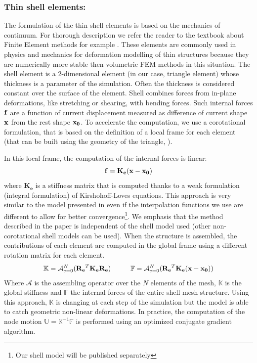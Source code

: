 \subsubsection{Thin shell elements: } 
The formulation of the thin shell elements is based on the mechanics of continuum. 
For thorough description we refer the reader to the textbook about Finite Element methods for example \cite{Reddy1993}.
These elements are commonly used in physics and mechanics for deformation modelling of thin structures because they are numerically more stable then volumetric FEM methods in this situation. 
The shell element is a 2-dimensional element (in our case, triangle element) whose thickness is a parameter of the simulation.
Often the thickness is considered constant over the surface of the element.
Shell combines forces from in-plane deformations, like stretching or shearing, with bending forces. 
Such internal forces $\mathbf{f}$ are a function of current displacement measured as difference of current shape
$\mathbf{x}$ from the rest shape $\mathbf{x_0}$.
To accelerate the computation, we use a corotational formulation, that is based on the definition of a local frame for each element (that can be built using the geometry of the triangle, ). 

In this local frame, the computation of the internal forces is linear:
\begin{equation}
  \mathbf{f} = \mathbf{K_e}(\mathbf{x} - \mathbf{x_0})
 \label{linear_static_model} 
\end{equation}
where $\mathbf{K_e}$ is a stiffness matrix that is computed thanks to a weak formulation (integral formulation) of Kirshohoff-Loves equations.
This approach is very similar to the model presented in  \cite{Comas2010b,Comas2010c}  even if the interpolation functions we use are  different to allow for better convergence\footnote{Our shell model will be published separately}. 
We emphasis that the method described in the paper is independent of the shell model used (other non-corotational shell models can be used).
%
When the structure is assembled, the contributions of each element are computed in the global frame using a different rotation matrix for each element.
\begin{equation}
\mathbb{K} = \mathcal{A}_{e=0}^N (\mathbf{R_e}^T \mathbf{K_e} \mathbf{R_e}) \hspace{10mm}
\mathbb{F} = \mathcal{A}_{e=0}^N ( \mathbf{R_e}^T \mathbf{K_e}(\myvec{x} - \myvec{x_0}))
\end{equation}
Where $\mathcal{A}$ is the assembling operator over the $N$ elements of the mesh, $\mathbb{K}$ is the global stiffness and $\mathbb{F}$ the internal forces of the entire shell mesh structure. 
Using this approach, $\mathbb{K}$ is changing at each step of the simulation but the model is able to catch geometric non-linear deformations.
In practice, the computation of the node motion $\mathbb{U} = \mathbb{K}^{-1} \mathbb{F}$ is performed using an optimized conjugate gradient algorithm.


